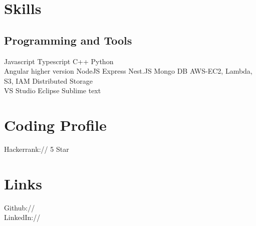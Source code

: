 \documentclass[]{deedy-resume-openfont}
\begin{document}
%
%


%
%



%
%

\begin{minipage}[t]{0.33\textwidth} 


\section{Skills}
\subsection{Programming and Tools}
Javascript \textbullet{}   Typescript \textbullet{}  C++ \textbullet{} Python\\
Angular higher version \textbullet{} NodeJS \textbullet{} Express \textbullet{} Nest.JS \textbullet{}  Mongo DB \textbullet{} AWS-EC2, Lambda, S3, IAM  \textbullet{} Distributed Storage \\
VS Studio \textbullet{} Eclipse \textbullet{} Sublime text
\sectionsep


\section{Coding Profile} 
Hackerrank:// \href{https://www.hackerrank.com/mondalkoushik508}{} 5 Star \\
\sectionsep


\section{Links} 
Github:// \href{https://github.com/koushikxoro}{} \\
LinkedIn://  \href{https://www.linkedin.com/in/koushik-mondal-b7a35312b/}{} \\


\end{minipage}
\end{document}
